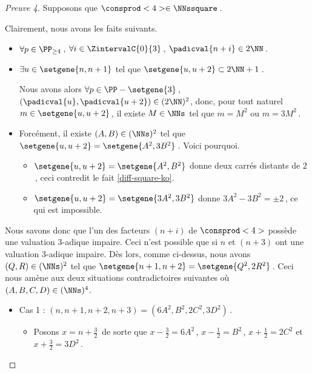 	
\begin{proof}[Preuve 4]
    Supposons que $\consprod<4> \in \NNssquare$\,.
    
    \smallskip
    
	Clairement, nous avons les faits suivants.
    \begin{itemize}
    	\item  
		$\forall p \in \PP_{\geq 4}$\,, 
   		$\forall i \in \ZintervalC{0}{3}$\,, 
    	$\padicval{n + i} \in 2 \NN$\,.
	
	
		\item $\exists u \in \setgene{n, n+1}$ tel que $\setgene{u, u + 2} \subset 2 \NN + 1$\,.
		
		\noindent
		Nous avons alors
		$\forall p \in \PP - \setgene{3}$\,, 
   		$(\padicval{u}, \padicval{u+2}) \in ( 2 \NN )^2$,
		donc, pour tout naturel $m \in \setgene{u, u + 2}$\,, 
		il existe $M \in \NNs$ tel que 
		$m = M^2$ ou $m = 3 M^2$\,.
	
	
		\item Forcément, il existe $(A, B) \in ( \NNs )^2$ tel que 
        $\setgene{u, u + 2} = \setgene{A^2, 3 B^2}$\,. Voici pourquoi.
        \begin{itemize}
        	\item $\setgene{u, u + 2} = \setgene{A^2, B^2}$ donne deux carrés distants de $2$\,, ceci contredit le fait \ref{diff-square-ko}.

        	\item $\setgene{u, u + 2} = \setgene{3 A^2, 3 B^2}$ donne $3 A^2 - 3 B^2 = \pm 2$\,, ce qui est impossible.
        \end{itemize}
    \end{itemize}

    \smallskip
	
	Nous savons donc que l'un des facteurs $(n+i)$ de $\consprod<4>$ possède une valuation $3$-adique impaire. Ceci n'est possible que si $n$ et $(n+3)$ ont une valuation $3$-adique impaire.
	Dès lors, comme ci-dessus, nous avons $(Q, R) \in ( \NNs )^2$ tel que $\setgene{n+1, n+2} = \setgene{Q^2, 2 R^2}$\,.
	Ceci nous amène aux deux situations contradictoires suivantes où $(A, B, C, D) \in ( \NNs )^4$.
	
    \begin{itemize}
    	\item Cas 1 : $(n, n+1, n+2, n+3) = (6A^2, B^2, 2C^2, 3D^2)$\,.
		\begin{itemize}
        	\item Posons $x = n + \frac32$\, de sorte que 
        	$x - \frac32 = 6 A^2$\,, $x - \frac12 = B^2$\,, $x + \frac12 = 2 C^2$ et $x + \frac32 = 3 D^2$\,.
        

\end{itemize}
\end{itemize}
\end{proof}
